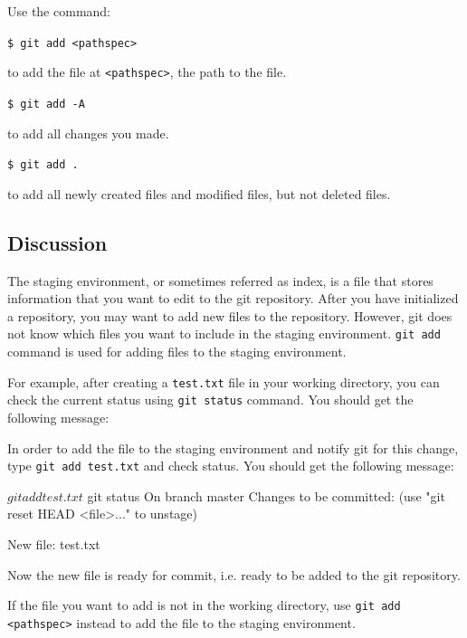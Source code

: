 \documentclass[12pt]{report}
\newcommand\code[1]{{\color{blue}\texttt{#1}}}
\begin{document}
Use the command:

\code{\$ git add <pathspec>}

to add the file at \code{<pathspec>}, the path to the file.

\code{\$ git add -A}

to add all changes you made.

\code{\$ git add .}

to add all newly created files and modified files, but not deleted files.

\subsection*{Discussion}

The staging environment, or sometimes referred as index, is a file that stores information that you want to edit to the git repository. After you have initialized a repository, you may want to add new files to the repository. However, git does not know which files you want to include in the staging environment. \code{git add} command is used for adding files to the staging environment.

For example, after creating a \texttt{test.txt} file in your working directory, you can check the current status using \code{git status} command. You should get the following message:


In order to add the file to the staging environment and notify git for this change, type \code{git add test.txt} and check status. You should get the following message:

\begin{blockcode}
$ git add test.txt
$ git status
On branch master
Changes to be committed:
  (use "git reset HEAD <file>..." to unstage)
  
    New file: test.txt

\end{blockcode}

Now the new file is ready for commit, i.e. ready to be added to the git repository.

If the file you want to add is not in the working directory, use \code{git add <pathspec>} instead to add the file to the staging environment.
\end{document}
